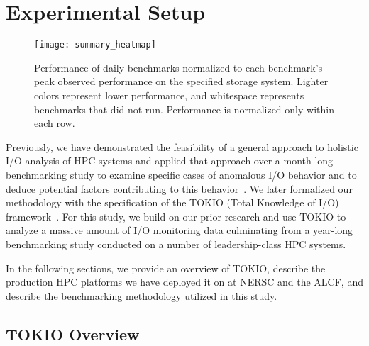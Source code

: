 \section{Experimental Setup}

\begin{figure*}
    \centering
    \texttt{[image: summary\_heatmap]}
    \vspace{-.2in}
    \caption{Performance of daily benchmarks normalized to each benchmark's peak observed performance on the specified storage system.  Lighter colors represent lower performance, and whitespace represents benchmarks that did not run.  Performance is normalized only within each row.}
    \label{fig:summary-heatmap}
\end{figure*}



Previously, we have demonstrated the feasibility of a general approach to holistic I/O analysis of HPC systems and applied that approach over a month-long benchmarking study to examine specific cases of anomalous I/O behavior and to deduce potential factors contributing to this behavior~\cite{Lockwood2017}. We later formalized our methodology with the specification of the TOKIO (Total Knowledge of I/O) framework~\cite{Lockwood2018tokio}. For this study, we build on our prior research and use TOKIO to analyze a massive amount of I/O monitoring data culminating from a year-long benchmarking study conducted on a number of leadership-class HPC systems. 

In the following sections, we provide an overview of TOKIO, describe the production HPC platforms we have deployed it on at NERSC and the ALCF, and describe the benchmarking methodology  utilized in this study.

\subsection{TOKIO Overview}

